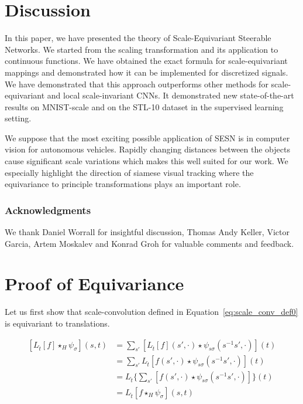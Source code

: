 \documentclass{article} \usepackage{multirow}
\def\Eqref#1{Equation~\ref{#1}}
\begin{document}
 \section{Discussion}
\label{sec:discussions}
In this paper, we have presented the theory of Scale-Equivariant Steerable Networks.
We started from the scaling transformation and its application to continuous functions.
We have obtained the exact formula for scale-equivariant mappings and demonstrated how 
it can be implemented for discretized signals. 
We have demonstrated that this approach outperforms other 
methods for scale-equivariant and local scale-invariant CNNs. 
It demonstrated new state-of-the-art 
results on MNIST-scale and on the STL-10 
dataset in the supervised learning setting.

We suppose that the most exciting possible application of SESN is in computer vision for 
autonomous vehicles. Rapidly changing distances between the objects 
cause significant scale variations which makes this well suited for our work.
We especially highlight the direction of siamese visual tracking 
where the equivariance to principle transformations plays an important role.


 
\subsubsection*{Acknowledgments}
We thank Daniel Worrall for insightful discussion, Thomas Andy Keller, Victor Garcia, 
Artem Moskalev and Konrad Groh for valuable comments and feedback.





\appendix
\newpage
\section{Proof of Equivariance}
\label{sec:appendix_proof}
Let us first show that scale-convolution defined in \Eqref{eq:scale_conv_def0} is equivariant to translations.

\begin{equation}
    \label{eq:appendix_equivariance_proof_1}
    \begin{split}
        [L_{\hat{t}}[f] \star_H \psi_\sigma](s, t)
        &= \sum_{s'}  [L_{\hat{t}}[f] (s', \cdot) \star \psi_{s\sigma}(s^{-1}s', \cdot)](t) \\
        &= \sum_{s'}  L_{\hat{t}}[f (s', \cdot) \star \psi_{s\sigma}(s^{-1}s', \cdot)](t) \\
        &= L_{\hat{t}}\Big\{\sum_{s'}[f (s', \cdot) \star \psi_{s\sigma}(s^{-1}s', \cdot)]\Big\}(t) \\
        &= L_{\hat{t}}[f \star_H \psi_\sigma](s, t)
    \end{split}
\end{equation}
\end{document}
